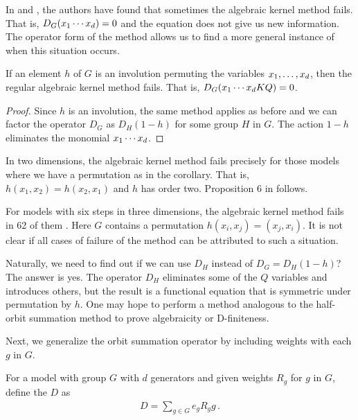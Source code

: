 In \cite[p.~11]{bousquet2010walks} and \cite[p.~13]{bostan2014three}, the authors have found that sometimes the algebraic kernel method fails. That is, $D_G(x_1\cdots x_d) = 0$ and the equation does not give us new information. The operator form of the method allows us to find a more general instance of when this situation occurs.

\begin{cor} If an element $h$ of $G$ is an involution permuting the variables $x_1,\ldots, x_d$, then the regular algebraic kernel method fails. That is, $D_G(x_1\cdots x_d KQ) = 0$.
\end{cor}
\begin{proof} Since $h$ is an involution, the same method applies as before and we can factor the operator $D_G$ as $ D_H(1-h)$ for some group $H$ in $G$. The action $1-h$ eliminates the monomial $x_1\cdots x_d$.
\end{proof}

\begin{exa} In two dimensions, the algebraic kernel method fails precisely for those models where we have a permutation as in the corollary. That is, $h(x_1,x_2)= h(x_2,x_1)$ and $h$ has order two. Proposition 6 in \cite[p.~12]{bousquet2010walks} follows.

For models with six steps in three dimensions, the algebraic kernel method fails in 62  of them \cite[p.~13]{bostan2014three}. Here $G$ contains a permutation $h(x_i,x_j) = (x_j,x_i)$. It is not clear if all cases of failure of the method can be attributed to such a situation.
\end{exa}
Naturally, we need to find out if we can use $D_H$ instead of $D_G = D_H(1-h)$? The answer is yes. The operator $D_H$ eliminates some of the $Q$ variables and introduces others, but the result is a functional equation  that is symmetric under permutation by $h$. One may hope to perform a method analogous to the half-orbit summation method to prove algebraicity or D-finiteness.

Next, we generalize the orbit summation operator by including weights with each $g$ in $G$.

\begin{defn} For a \classic \dD model with group $G$ with $d$ generators and given weights $R_g$ for $g$ in $G$, define the  $D$ as
\begin{align}
	D = \sum_{g\in G}e_g R_g g\,.
\end{align}
\end{defn}

